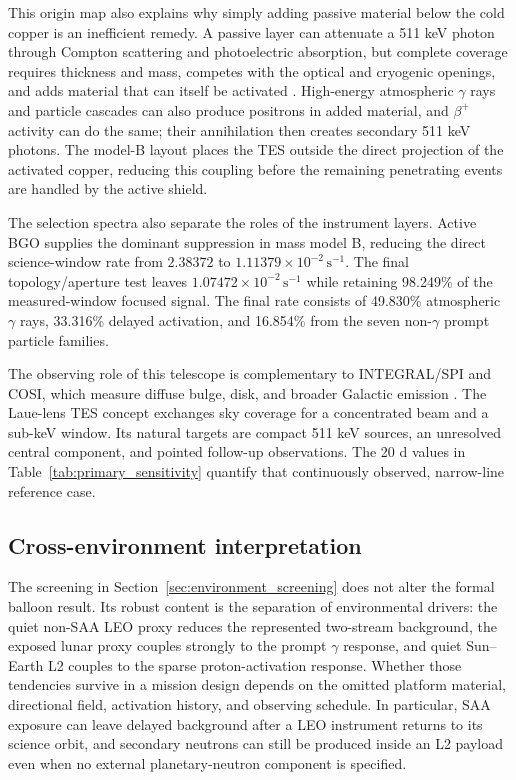 \documentclass[11pt]{article}
\newcommand{\revblue}[1]{\textcolor{revisionblue}{#1}}
\newcommand{\cps}{\ensuremath{\,\mathrm{s^{-1}}}}
\begin{document}
This origin map also explains why simply adding passive material below the cold
copper is an inefficient remedy. A passive layer can attenuate a 511 keV photon
through Compton scattering and photoelectric absorption, but complete coverage
requires thickness and mass, competes with the optical and cryogenic openings,
and adds material that can itself be activated \cite{NISTXCOM}. \revblue{High-energy
atmospheric $\gamma$ rays and particle cascades} can also produce positrons in added
material, and $\beta^+$ activity can do the same; their annihilation then
creates secondary 511 keV photons. The model-B layout places the TES outside the
direct projection of the activated copper, reducing this coupling before the
remaining penetrating events are handled by the active shield.

The selection spectra also separate the roles of the instrument layers. Active
BGO supplies the dominant suppression in mass model B, reducing the direct
science-window rate from $2.38372$ to $1.11379\times10^{-2}\cps$. The final
topology/aperture test leaves $1.07472\times10^{-2}\cps$ while retaining
98.249\% of the measured-window focused signal. The final rate consists of
\revblue{49.830\% atmospheric $\gamma$ rays}, 33.316\% delayed activation, and 16.854\%
from the \revblue{seven non-$\gamma$ prompt particle families}.

The observing role of this telescope is complementary to INTEGRAL/SPI and COSI,
which measure diffuse bulge, disk, and broader Galactic emission
\cite{Siegert2016AA,Kierans2020,Siegert2020COSI,Yoneda2025,Karwin2023}. The
Laue-lens TES concept exchanges sky coverage for a concentrated beam and a
sub-keV window. Its natural targets are compact 511 keV sources, an unresolved
central component, and pointed follow-up observations. The 20 d values in
Table~\ref{tab:primary_sensitivity} quantify that continuously observed,
narrow-line reference case.

\subsection{Cross-environment interpretation}

The screening in Section~\ref{sec:environment_screening} does not alter the
formal balloon result. Its robust content is the separation of environmental
drivers: the quiet non-SAA LEO proxy reduces the represented two-stream
background, the exposed lunar proxy couples strongly to the prompt
$\gamma$ response, and quiet Sun--Earth L2 couples to the sparse
proton-activation response. Whether those tendencies survive in a mission
design depends on the omitted platform material, directional field, activation
history, and observing schedule. In particular, SAA exposure can leave delayed
background after a LEO instrument returns to its science orbit, and secondary
neutrons can still be produced inside an L2 payload even when no external
planetary-neutron component is specified.
\end{document}
